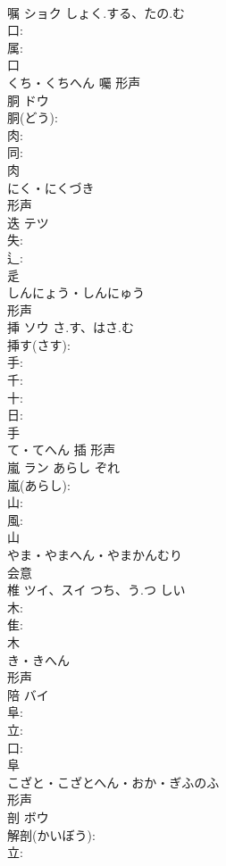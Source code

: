 \documentclass[8pt]{extreport}
\begin{document}
\begin{CJK}{UTF8}{min}
\\	嘱	ショク	しょく.する、たの.む		
\\	口: 
\\	属: 
\\	口	
\\	くち・くちへん	囑	形声 
\\	胴	ドウ			
\\	胴(どう): 
\\	肉: 
\\	同: 
\\	肉	
\\	にく・にくづき	
\\	形声 
\\	迭	テツ			
\\	失: 
\\	辶: 
\\	辵	
\\	しんにょう・しんにゅう	
\\	形声 
\\	挿	ソウ	さ.す、はさ.む		
\\	挿す(さす): 
\\	手: 
\\	千: 
\\	十: 
\\	日: 
\\	手	
\\	て・てへん	插	形声 
\\	嵐	ラン	あらし	ぞれ	
\\	嵐(あらし): 
\\	山: 
\\	風: 
\\	山	
\\	やま・やまへん・やまかんむり	
\\	会意 
\\	椎	ツイ、スイ	つち、う.つ	しい	
\\	木: 
\\	隹: 
\\	木	
\\	き・きへん	
\\	形声 
\\	陪	バイ			
\\	阜: 
\\	立: 
\\	口: 
\\	阜	
\\	こざと・こざとへん・おか・ぎふのふ	
\\	形声 
\\	剖	ボウ			
\\	解剖(かいぼう): 
\\	立: 

\end{CJK}
\end{document}
